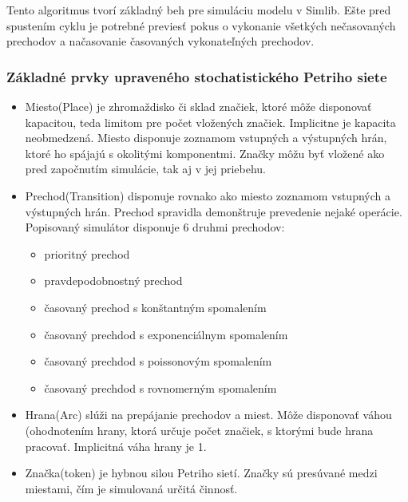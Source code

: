 \documentclass[12pt,a4paper,titlepage,final]{article}
\begin{document}
Tento algoritmus tvorí základný beh pre simuláciu modelu v Simlib.
Ešte pred spustením cyklu je potrebné previesť pokus o vykonanie všetkých nečasovaných prechodov a načasovanie časovaných vykonateľných prechodov.


\subsubsection{Základné prvky upraveného stochatistického Petriho siete}
\begin{itemize}
\item Miesto(Place) je zhromaždisko či sklad značiek, ktoré môže disponovať kapacitou, teda limitom pre počet vložených značiek. Implicitne je kapacita neobmedzená. Miesto disponuje zoznamom vstupných a výstupných hrán, ktoré ho spájajú s okolitými komponentmi. Značky môžu byť vložené ako pred započnutím simulácie, tak aj v jej priebehu.
\item Prechod(Transition) disponuje rovnako ako miesto zoznamom vstupných a výstupných hrán. Prechod spravidla demonštruje prevedenie nejaké operácie. Popisovaný simulátor disponuje 6 druhmi prechodov:
\begin{itemize}
\item prioritný prechod
\item pravdepodobnostný prechod
\item časovaný prechod s konštantným spomalením
\item časovaný prechdod s exponenciálnym spomalením
\item časovaný prechdod s poissonovým spomalením
\item časovaný prechdod s rovnomerným spomalením
\end{itemize}

\item Hrana(Arc) slúži na prepájanie prechodov a miest. Môže disponovať váhou (ohodnotením hrany, ktorá určuje počet značiek, s ktorými bude hrana pracovať. Implicitná váha hrany je 1.
\item Značka(token) je hybnou silou Petriho sietí. Značky sú presúvané medzi miestami, čím je simulovaná určitá činnosť.
\end{itemize}
\end{document}

